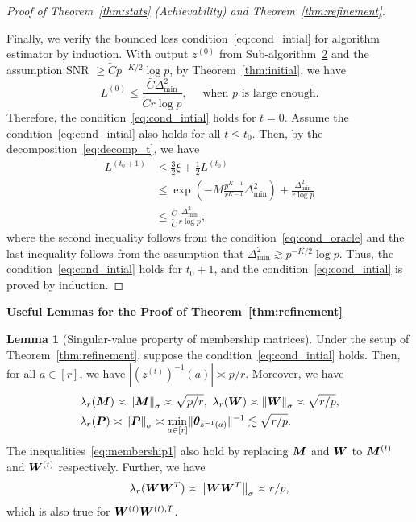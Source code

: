 \documentclass[journal]{IEEEtran}
\theoremstyle{definition}
\newtheorem{lem}{Lemma}
\theoremstyle{definition}
\newcommand{\of}[1]{\left(#1\right)}
\begin{document}
\begin{proof}[Proof of Theorem~\ref{thm:stats} (Achievability) and Theorem~\ref{thm:refinement}]
{    }
    
    Finally, we verify the bounded loss condition~\eqref{eq:cond_intial} for algorithm estimator by induction.  With output $z^{(0)}$ from Sub-algorithm~\hyperref[alg:main]{2} and the assumption SNR $\geq \tilde C p^{-K/2} \log p$, by Theorem~\ref{thm:initial}, we have 
    \begin{equation}
        L^{(0)} \leq \frac{\bar C \Delta_{\min}^2}{\tilde C r \log p},\quad \text{    when $p$ is large enough}.
    \end{equation}
Therefore, the condition~\eqref{eq:cond_intial} holds for $t = 0$. Assume the condition~\eqref{eq:cond_intial} also holds for all $t \leq t_0$. Then, by the decomposition~\eqref{eq:decomp_t}, we have 
    \begin{align}
         L^{(t_0+1)} &\leq \frac{3}{2} \xi + \frac{1}{2} L^{(t_0)} \\
         & \leq \exp \of{  - M \frac{p^{K-1}}{r^{K-1}}   \Delta_{\min}^2 } + \frac{\Delta_{\min}^2}{r \log p} \\
         & \leq \frac{\bar C}{\tilde C}\frac{\Delta_{\min}^2}{r\log p} ,
    \end{align}
    where the second inequality follows from the condition~\eqref{eq:cond_oracle} and the last inequality follows from the assumption that $\Delta_{\min}^2 \gtrsim p^{-K/2} \log p$. Thus, the condition~\eqref{eq:cond_intial} holds for $t_0 + 1$, and the condition~\eqref{eq:cond_intial} is proved by induction.
\end{proof}

{\bf Useful Lemmas for the Proof of Theorem~\ref{thm:refinement}} 



\begin{lem}[Singular-value property of membership matrices]\label{lem:membership} Under the setup of Theorem~\ref{thm:refinement}, suppose the condition~\eqref{eq:cond_intial} holds. Then, for all $a \in [r]$, we have $|\of{z^{(t)}}^{-1}(a)| \asymp p/r$. Moreover, we have 
\begin{align}
     &\lambda_{r}(\mM) \asymp \onorm{\mM}_{\sigma} \asymp \sqrt{p/r}, \  \lambda_{r}(\mW) \asymp \onorm{\mW}_{\sigma} \asymp \sqrt{r/p},\\
     &\lambda_{r}(\mP) \asymp \onorm{\mP}_{\sigma}    \asymp  \min_{a \in [r] } \onormSize{}{\mtheta_{z^{-1}(a)}}^{-1}  \lesssim  \sqrt{r/p}. \label{eq:membership1}
\end{align}
The inequalities~\eqref{eq:membership1} also hold by replacing $\bm M$ and $\bm{W}$ to $\bm M^{(t)}$ and $\bm{W}^{(t)}$ respectively. 
Further, we have 
\begin{equation}\label{eq:WWsingular}
   \lambda_{r}(\mW\mW^T) \asymp \onorm{\mW\mW^T}_{\sigma} \asymp r/p,
\end{equation}
which is also true for $\bm{W}^{(t)}\bm{W}^{(t),T}$.
\end{lem}
\end{document}
